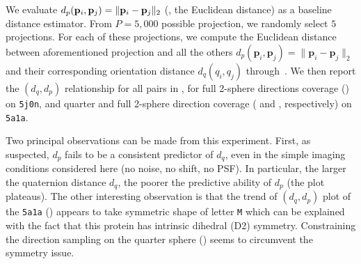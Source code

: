 We evaluate $d_p(\mathbf{p}_i, \mathbf{p}_j) = \Vert \mathbf{p}_i - \mathbf{p}_j \Vert_2$ (\ie, the Euclidean distance) as a baseline distance estimator.
From $P = 5,000$ possible projection, we randomly select $5$ projections.
For each of these projections, we compute the Euclidean distance between aforementioned projection and all the others $d_p(\mathbf{p}_i,\mathbf{p}_j)=\lVert\mathbf{p}_i-\mathbf{p}_j\rVert_2$ and their corresponding orientation distance $d_q(q_i,q_j)$ through~.
We then report the $(d_q,d_p)$ relationship for all pairs in , for full 2-sphere directions coverage () on \texttt{5j0n}, and quarter and full 2-sphere direction coverage ( and , respectively) on \texttt{5a1a}.

Two principal observations can be made from this experiment.
First, as suspected, $d_p$ fails to be a consistent predictor of $d_q$, even in the simple imaging conditions considered here (no noise, no shift, no PSF).
In particular, the larger the quaternion distance $d_q$, the poorer the predictive ability of $d_p$ (the plot plateaus).
The other interesting observation is that the trend of $(d_q,d_p)$ plot of the \texttt{5a1a} () appears to take symmetric shape of letter \texttt{M} which can be explained with the fact that this protein has intrinsic dihedral (D2) symmetry. Constraining the direction sampling on the quarter sphere () seems to circumvent the symmetry issue.

